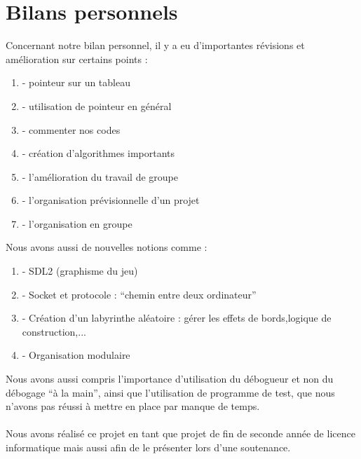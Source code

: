﻿\documentclass[12pt,a4paper,twoside]{article}
\begin{document}
\section{Bilans personnels}
Concernant notre bilan personnel, il y a eu d’importantes révisions et amélioration sur certains points : 
\begin{enumerate}
\item- pointeur sur un tableau
\item- utilisation de pointeur en général
\item- commenter nos codes
\item- création d’algorithmes importants
\item- l’amélioration du travail de groupe
\item- l’organisation prévisionnelle d’un projet
\item- l’organisation en groupe 
\end{enumerate}
Nous avons aussi de nouvelles notions comme : 
\begin{enumerate}
\item- SDL2  (graphisme du jeu)
\item- Socket et protocole : “chemin entre deux ordinateur”
\item- Création d’un labyrinthe aléatoire : gérer les effets de bords,logique de construction,...
\item- Organisation modulaire
\end{enumerate}
Nous avons aussi compris l’importance d’utilisation du débogueur et non du débogage “à la main”, ainsi que l’utilisation de programme de test, que nous n’avons pas réussi à mettre en place par manque de temps.
\\
\\
Nous avons réalisé ce projet en tant que projet de fin de seconde année de licence informatique mais aussi afin de le présenter lors d'une soutenance.
\end{document}
